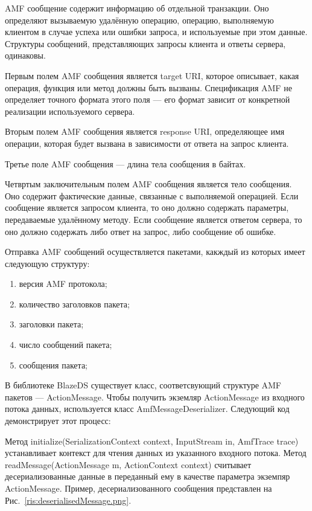 AMF сообщение содержит информацию об отдельной транзакции. Оно определяют вызываемую удалённую операцию, 
операцию, выполняемую клиентом в случае успеха или ошибки запроса, и используемые при этом данные. Структуры сообщений,
представляющих запросы клиента и ответы сервера, одинаковы.
 
Первым полем AMF сообщения является target URI, которое описывает, какая операция, функция или 
метод должны быть вызваны. Спецификация AMF не определяет точного формата этого поля --- его формат зависит 
от конкретной реализации используемого сервера.

Вторым полем AMF сообщения является response URI, определяющее имя операции, которая будет вызвана в зависимости от 
ответа на запрос клиента.

Третье поле AMF сообщения --- длина тела сообщения в байтах.

Четвртым заключительным полем AMF сообщения является тело сообщения. Оно содержит фактические данные, связанные 
с выполняемой операцией. Если сообщение является запросом клиента, то оно должно содержать параметры, передаваемые 
удалённому методу. Если сообщение является ответом сервера, то оно должно содержать либо ответ на запрос, либо 
сообщение об ошибке.

Отправка AMF сообщений осуществляется пакетами, какждый из которых имеет следующую структуру:

\begin{enumerate}
\item версия AMF протокола;
\item количество заголовков пакета;
\item заголовки пакета;
\item число сообщений пакета;
\item сообщения пакета;
\end{enumerate}

В библиотеке BlazeDS существует класс, соответсвующий структуре AMF пакетов --- ActionMessage. Чтобы получить экземляр 
ActionMessage из входного потока данных, используется класс AmfMessageDeserializer. Следующий код демонстрирует 
этот процесс:


 
Метод initialize(SerializationContext context, InputStream in, AmfTrace trace) устанавливает контекст для чтения данных из 
указанного входного потока. Метод readMessage(ActionMessage m, ActionContext context) считывает десериализованные данные в 
переданный ему в качестве параметра экземпяр ActionMessage. Пример, десериализованного сообщения представлен на Рис.~\ref{ris:deserialisedMessage.png}.

